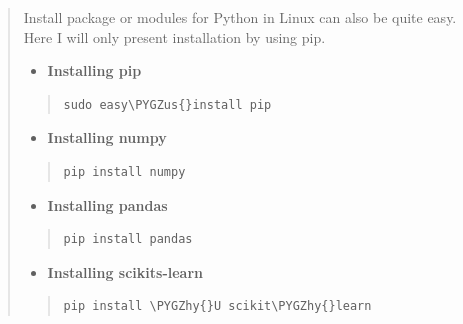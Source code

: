 \documentclass[letterpaper,11pt,english]{sphinxmanual}
\def\PYGZus{\char`\_}
\def\PYGZhy{\char`\-}
\begin{document}
\begin{quote}

Install package or modules for Python in Linux can also be quite easy. Here I will only present installation by using pip.
\begin{itemize}
\item {} 
\textbf{Installing pip}

\end{itemize}
\begin{quote}

\begin{Verbatim}[commandchars=\\\{\}]
sudo easy\PYGZus{}install pip
\end{Verbatim}
\end{quote}
\begin{itemize}
\item {} 
\textbf{Installing numpy}

\end{itemize}
\begin{quote}

\begin{Verbatim}[commandchars=\\\{\}]
pip install numpy
\end{Verbatim}
\end{quote}
\begin{itemize}
\item {} 
\textbf{Installing pandas}

\end{itemize}
\begin{quote}

\begin{Verbatim}[commandchars=\\\{\}]
pip install pandas
\end{Verbatim}
\end{quote}
\begin{itemize}
\item {} 
\textbf{Installing scikits-learn}

\end{itemize}
\begin{quote}

\begin{Verbatim}[commandchars=\\\{\}]
pip install \PYGZhy{}U scikit\PYGZhy{}learn
\end{Verbatim}
\end{quote}
\end{quote}
\end{document}
